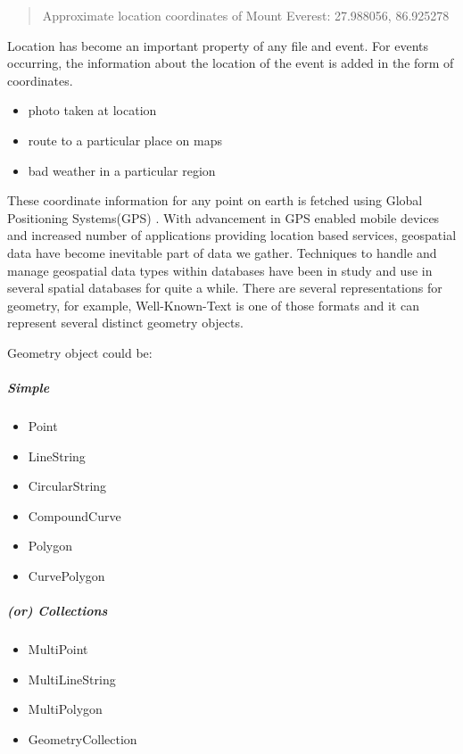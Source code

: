 \documentclass[article,type=msc,colorback,12pt,accentcolor=tud1d]{tudthesis}
\begin{document}
			   \begin{quote}
			   	\centering  Approximate location coordinates of Mount Everest: 27.988056, 86.925278  \cite{MtEverest}
			   \end{quote}
			  
			   
			   Location has become an important property of any file and event. For events occurring, the information about the location of the event is added in the form of coordinates.   
			   
			   \begin{itemize}
			   	\item photo taken at location
			   	\item route to a particular place on maps
			   	\item bad weather in a particular region
			   	
			   \end{itemize}
			   
			   These coordinate information for any point on earth is fetched using Global Positioning Systems(GPS) \cite{wiki:gps}. With advancement in GPS enabled mobile devices and increased number of applications providing location based services, geospatial data have become inevitable part of data we gather. Techniques to handle and manage geospatial data types within databases have been in study and use in several spatial databases for quite a while. There are several representations for geometry, for example, Well-Known-Text is one of those formats and it can represent several distinct geometry objects.
			   
			   Geometry object could be: \cite{spatialdatatypes}
			 \subparagraph{Simple}
			 \begin{itemize}
				   \item  Point
				   \item  LineString
				   \item  CircularString
				   \item  CompoundCurve
				   \item  Polygon
				   \item  CurvePolygon
			 \end{itemize}
			  \subparagraph{(or) Collections}
			  \begin{itemize}
				  	\item  MultiPoint
				    \item  MultiLineString
				    \item  MultiPolygon
				    \item  GeometryCollection
			  \end{itemize}
			  
\end{document}
